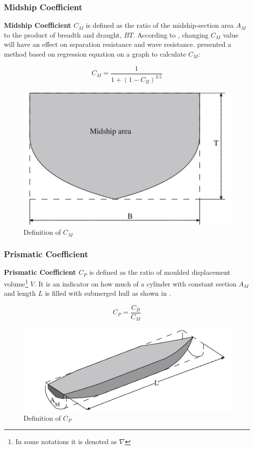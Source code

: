 \subsubsection*{Midship Coefficient}
\textbf{Midship Coefficient $C_M$} is defined as the ratio of the midship-section area $A_M$ to the product of breadth and draught, $BT$. According to , changing $C_M$ value will have an effect on separation resistance and wave resistance.  presented a method based on regression equation on a graph to calculate $C_M$:  

\begin{equation}
    \label{eqn:CM_jensen}
    C_M = \frac{1}{1+(1-C_B)^{3.5}}
\end{equation}

\begin{figure}[ht]
    \centering
        \includegraphics[width=.4\textwidth]{02_figures/biran14_cm.jpg}
        \caption{Definition of $C_M$ }
        \label{fig:biran_cm}
\end{figure}

\subsubsection*{Prismatic Coefficient}

\textbf{Prismatic Coefficient $C_P$} is defined as the ratio of moulded displacement volume\footnote{In some notations it is denoted as $\nabla$} $V$. It is an indicator on how much of a cylinder with constant section $A_M$ and length $L$ is filled with submerged hull as shown in .

\begin{equation}
    \label{eqn:cp_ratio}
    C_P = \frac{C_B}{C_M}
\end{equation}

\begin{figure}[ht]
    \centering
        \includegraphics[width=.5\textwidth]{02_figures/biran14_cp.jpg}
        \caption{Definition of $C_P$ }
        \label{fig:biran_cp}
\end{figure}

